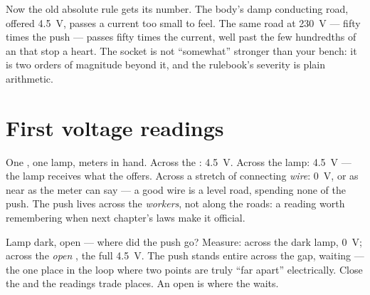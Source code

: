\begin{remark}\label{rem:g8:voltage-voltmeter:mains}
Now the old absolute rule gets its number. The body's damp
conducting road, offered \qty{4.5}{V}, passes a current too
small to feel. The same road at \qty{230}{V} --- fifty times
the push --- passes fifty times the current, well past the few
hundredths of an  that stop a heart. The socket is not
``somewhat'' stronger than your  bench: it is two
orders of magnitude beyond it, and the rulebook's severity is
plain arithmetic.
\end{remark}

\section{First voltage readings}

\begin{example}\label{ex:g8:voltage-voltmeter:readings}
One , one lamp, meters in hand. Across the :
\qty{4.5}{V}. Across the lamp: \qty{4.5}{V} --- the lamp
receives what the  offers. Across a stretch of
connecting \emph{wire}: \qty{0}{V}, or as near as the meter can
say --- a good wire is a level road, spending none of the push.
The push lives across the \emph{workers}, not along the roads:
a reading worth remembering when next chapter's laws make it
official.
\end{example}

\begin{example}\label{ex:g8:voltage-voltmeter:openswitch}
Lamp dark,  open --- where did the push go? Measure:
across the dark lamp, \qty{0}{V}; across the \emph{open
}, the full \qty{4.5}{V}. The  push stands
entire across the gap, waiting --- the one place in the loop
where two points are truly ``far apart'' electrically. Close
the  and the readings trade places. An open  is
where the  waits.
\end{example}

